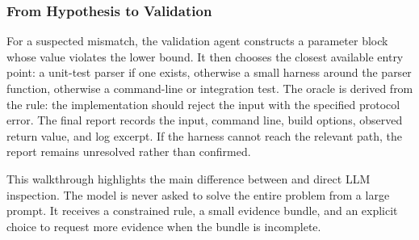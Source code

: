 \subsubsection{From Hypothesis to Validation}

For a suspected mismatch, the validation agent constructs a parameter block
whose value violates the lower bound. It then chooses the closest available
entry point: a unit-test parser if one exists, otherwise a small harness around
the parser function, otherwise a command-line or integration test. The oracle is
derived from the rule: the implementation should reject the input with the
specified protocol error. The final report records the input, command line,
build options, observed return value, and log excerpt. If the harness cannot
reach the relevant path, the report remains unresolved rather than confirmed.

This walkthrough highlights the main difference between \tool{} and direct LLM
inspection. The model is never asked to solve the entire problem from a large
prompt. It receives a constrained rule, a small evidence bundle, and an explicit
choice to request more evidence when the bundle is incomplete.
